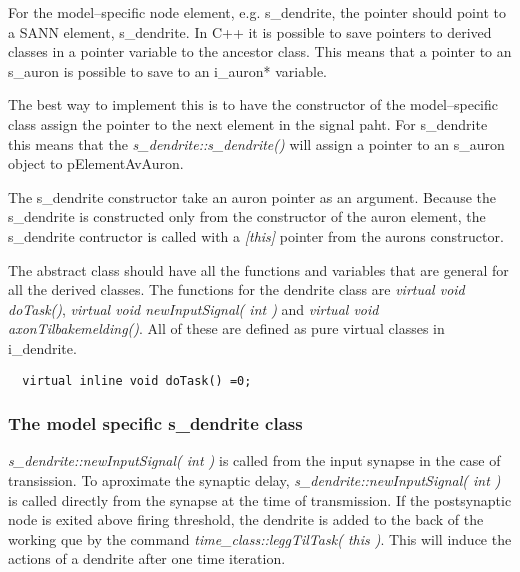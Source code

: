 	For the model--specific node element, e.g. s\_dendrite, the pointer should point to a SANN element, s\_dendrite. In C++ it is possible to save pointers to derived classes in a pointer variable to the ancestor class.
	This means that a pointer to an s\_auron is possible to save to an i\_auron* variable.

	The best way to implement this is to have the constructor of the model--specific class assign the pointer to the next element in the signal paht. 
	For s\_dendrite this means that the \emph{s\_dendrite::s\_dendrite()} will assign a pointer to an s\_auron object to pElementAvAuron.

	The s\_dendrite constructor take an auron pointer as an argument. 
	Because the s\_dendrite is constructed only from the constructor of the auron element, the s\_dendrite contructor is called with a \emph{[this]} pointer from the aurons constructor.

	The abstract class should have all the functions and variables that are general for all the derived classes. 
	The functions for the dendrite class are \emph{virtual void doTask()}, \emph{virtual void newInputSignal( int )} and \emph{virtual void axonTilbakemelding()}. 
	All of these are defined as pure virtual classes in i\_dendrite.

\begin{lstlisting}
  virtual inline void doTask() =0;
\end{lstlisting}

	\subsubsection{The model specific s\_dendrite class}
	
	\emph{s\_dendrite::newInputSignal( int )} is called from the input synapse in the case of transission. 
	To aproximate the synaptic delay, \emph{s\_dendrite::newInputSignal( int )} is called directly from the synapse at the time of transmission.
	If the postsynaptic node is exited above firing threshold, the dendrite is added to the back of the working que by the command \emph{time\_class::leggTilTask( this )}. 
	This will induce the actions of a dendrite after one time iteration.


